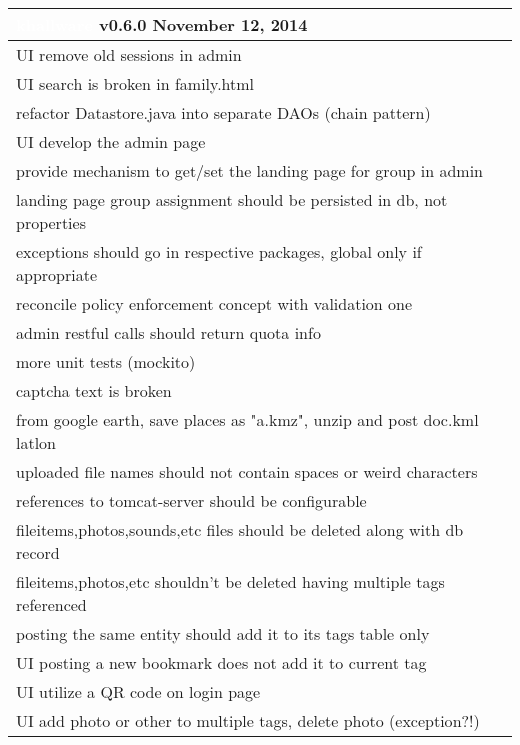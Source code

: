\documentclass[notitlepage]{article}
\newcommand{\releasedate}{November 12, 2014}
\begin{document}
\begin{center}
\begin{tabular}{ | l | }
\hline
\LARGE\cellcolor{myblue}\textcolor{white}{khallware} v0.6.0 \releasedate{} \\
\hline
UI remove old sessions in admin \\
\hline
UI search is broken in family.html \\
\hline
refactor Datastore.java into separate DAOs (chain pattern) \\
\hline
UI develop the admin page \\
\hline
provide mechanism to get/set the landing page for group in admin \\
\hline
landing page group assignment should be persisted in db, not properties \\
\hline
exceptions should go in respective packages, global only if appropriate \\
\hline
reconcile policy enforcement concept with validation one \\
\hline
admin restful calls should return quota info \\
\hline
more unit tests (mockito) \\
\hline
captcha text is broken \\
\hline
from google earth, save places as "a.kmz", unzip and post doc.kml latlon \\
\hline
uploaded file names should not contain spaces or weird characters \\
\hline
references to tomcat-server should be configurable \\
\hline
fileitems,photos,sounds,etc files should be deleted along with db record \\
\hline
fileitems,photos,etc shouldn't be deleted having multiple tags referenced \\
\hline
posting the same entity should add it to its tags table only \\
\hline
UI posting a new bookmark does not add it to current tag \\
\hline
UI utilize a QR code on login page \\
\hline
UI add photo or other to multiple tags, delete photo (exception?!) \\
\hline

\end{tabular}
\end{center}
\end{document}
